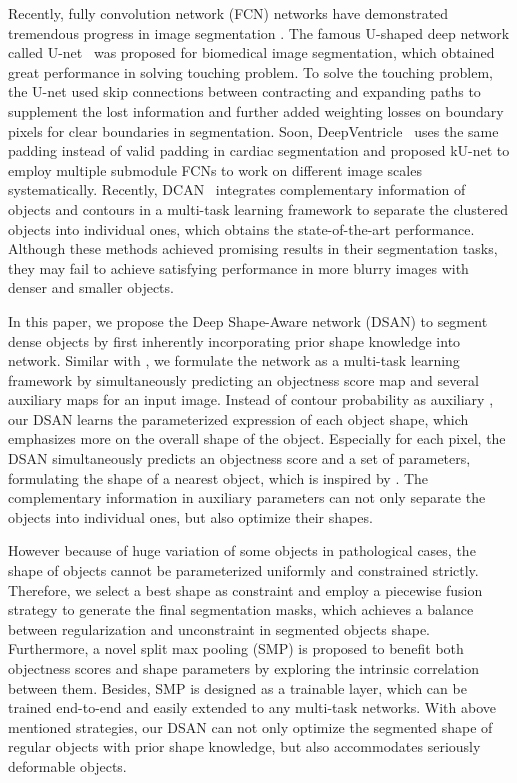 Recently, fully convolution network (FCN) networks have demonstrated tremendous progress in image segmentation \cite{Long2015a,Chen2016d,Dai2015,Zheng2015}.
The famous U-shaped deep network called U-net~\cite{Ronneberger2015} was proposed for biomedical image segmentation, which obtained great performance in solving touching problem.
To solve the touching problem, the U-net used skip connections between contracting and expanding paths to supplement the lost information and further added weighting losses on boundary pixels for clear boundaries in segmentation.
Soon, DeepVentricle~\cite{Lieman-Sifry2017} uses the same padding instead of valid padding in cardiac segmentation and \cite{Chen2016c} proposed kU-net to employ multiple submodule FCNs to work on different image scales systematically.
Recently, DCAN~\cite{Chen2017} integrates complementary information of objects and contours in a multi-task learning framework to separate the clustered objects into individual ones, which obtains the state-of-the-art performance.
Although these methods achieved promising results in their segmentation tasks, they may fail to achieve satisfying performance in more blurry images with denser and smaller objects.

In this paper, we propose the Deep Shape-Aware network (DSAN) to segment dense objects by first inherently incorporating prior shape knowledge into network.
Similar with \cite{Chen2017,Ren2015,Li2016a,Chen2016,Bertasius2016}, we formulate the network as a multi-task learning framework by simultaneously predicting an objectness score map and several auxiliary maps for an input image.
Instead of contour probability as auxiliary \cite{Chen2017,Chen2016,Bertasius2016}, our DSAN learns the parameterized expression of each object shape, which emphasizes more on the overall shape of the object.
Especially for each pixel, the DSAN simultaneously predicts an objectness score and a set of parameters, formulating the shape of a nearest object, which is inspired by \cite{Ren2015} .
The complementary information in auxiliary parameters can not only separate the objects into individual ones, but also optimize their shapes.

However because of huge variation of some objects in pathological cases, the shape of objects cannot be parameterized uniformly and constrained strictly.
Therefore, we select a best shape as constraint and employ a piecewise fusion strategy to generate the final segmentation masks, which achieves a balance between regularization and unconstraint in segmented objects shape.
Furthermore, a novel split max pooling (SMP) is proposed to benefit both objectness scores and shape parameters by exploring the intrinsic correlation between them.
Besides, SMP is designed as a trainable layer, which can be trained end-to-end and easily extended to any multi-task networks.
With above mentioned strategies, our DSAN can not only optimize the segmented shape of regular objects with prior shape knowledge, but also accommodates seriously deformable objects.

